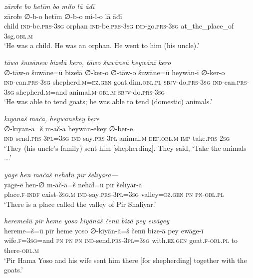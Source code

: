 \ea \label{ŽP.14}
\textit{zāroɫe bo hetīm bo milo lā āđī} \\ 
\gll zāroɫe ∅-b-o hetīm ∅-b-o mi-l-o lā āđī \\ 
 child \textsc{ind-}be\textsc{.prs}\textsc{-3sg} orphan \textsc{ind-}be\textsc{.prs}\textsc{-3sg} \textsc{ind-}go\textsc{.prs}\textsc{-3sg} at\_the\_place\_of 3sg\textsc{.obl}\textsc{.m} \\ 
\glt `He was a child. He was an orphan. He went to him (his uncle).'
\z 
 
\ea \label{ŽP.16}
\textit{tāwo šuwānew bizeɫā kero, tāwo šuwāneū heywānī kero} \\ 
\gll ∅-tāw-o šuwāne=ū bizeɫā ∅-ker-o ∅-tāw-o šuwāne=ū heywān-ī ∅-ker-o \\ 
 \textsc{ind-}can\textsc{.prs}\textsc{-3sg} shepherd\textsc{.m}\textsc{\textsc{=ez.gen}} goat.dim\textsc{.obl}\textsc{.pl} \textsc{sbjv-}do\textsc{.prs}\textsc{-3sg} \textsc{ind-}can\textsc{.prs}\textsc{-3sg} shepherd\textsc{.m}=and animal\textsc{.m}\textsc{-obl}\textsc{.m} \textsc{sbjv-}do\textsc{.prs}\textsc{-3sg} \\ 
\glt `He was able to tend goats; he was able to tend (domestic) animals.'
\z 
 
\ea \label{ŽP.18}
\textit{kīyānāš māčā, heywānekey bere} \\ 
\gll ∅-kīyān-ā=š m-āč-ā heywān-ekey ∅-ber-e \\ 
 \textsc{ind-}send\textsc{.prs}\textsc{-3pl}\textsc{=3sg} \textsc{ind-}say\textsc{.prs}\textsc{-3pl} animal\textsc{.m}\textsc{-def}\textsc{.obl}\textsc{.m} \textsc{imp-}take\textsc{.prs}-\textsc{2sg} \\ 
\glt `They (his uncle’s family) sent him [shepherding]. They said, ‘Take the animals ….'
\z 
 
\ea \label{ŽP.20}
\textit{yāgē hen māčāš nehāɫū pīr šelīyārā—} \\ 
\gll yāgē-ē hen-∅ m-āč-ā=š nehāɫ=ū pīr šelīyār-ā \\ 
 place\textsc{.f}\textsc{-indf} exist\textsc{-3sg}\textsc{.m} \textsc{ind-}say\textsc{.prs}\textsc{-3pl}\textsc{=3sg} valley\textsc{\textsc{=ez.gen}} \textsc{pn} \textsc{pn}\textsc{-obl}\textsc{.pl} \\ 
\glt `There is a place called the valley of Pir Shaliyar.'
\z 
 
\ea \label{ŽP.22}
\textit{heremešū pīr heme yoso kīyānāš čenū bizā pey ewāgey} \\ 
\gll hereme=š=ū pīr heme yoso ∅-kīyān-ā=š čenū bize-ā pey ewāge-ī \\ 
 wife\textsc{.f}\textsc{=3sg}=and \textsc{pn} \textsc{pn} \textsc{pn} \textsc{ind-}send\textsc{.prs}\textsc{-3pl}\textsc{=3sg} with\textsc{.ez.gen} goat\textsc{.f}\textsc{-obl}\textsc{.pl} to there\textsc{-obl}\textsc{.m} \\ 
\glt `Pir Hama Yoso and his wife sent him there [for shepherding] together with the goats.'
\z 
 

